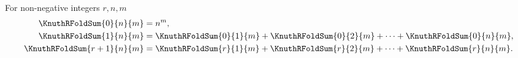 \begin{definition} 
  \label{def:multifold-sums-of-powers-recurrence}
  For non-negative integers $r,n,m$
  \begin{align*}
    \KnuthRFoldSum{0}{n}{m}   &= n^m, \\
    \KnuthRFoldSum{1}{n}{m}   &= \KnuthRFoldSum{0}{1}{m}
    + \KnuthRFoldSum{0}{2}{m} + \cdots + \KnuthRFoldSum{0}{n}{m}, \\
    \KnuthRFoldSum{r+1}{n}{m} &= \KnuthRFoldSum{r}{1}{m}
    + \KnuthRFoldSum{r}{2}{m} + \cdots + \KnuthRFoldSum{r}{n}{m}.
  \end{align*}
\end{definition}
